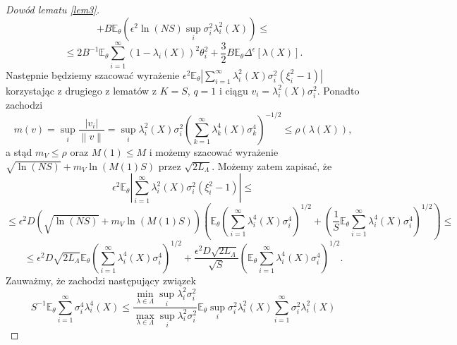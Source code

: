 \documentclass{mwart}
\newcommand{\norm}[1]{\left\lVert#1\right\rVert}
\begin{document}
\begin{proof}[Dowód lematu \ref{lem3}]
\begin{displaymath}
\end{displaymath}
\begin{displaymath}
+B\mathbb{E}_{\theta}\left(\epsilon^2\ln (NS)\sup_i\sigma_i^2\lambda_i^2(X)\right)\leq
\end{displaymath}
\begin{displaymath}
\leq 2B^{-1}\mathbb{E}_{\theta}\sum_{i=1}^{\infty}(1-\lambda_i(X))^2\theta_i^2+\frac{3}{2}B\mathbb{E}_{\theta}\Delta^{\epsilon}[\lambda(X)].
\end{displaymath}
Następnie będziemy szacować wyrażenie $\epsilon^2\mathbb{E}_{\theta}\left|\sum_{i=1}^{\infty}\lambda_i^2(X)\sigma_i^2(\xi^2_i-1)\right|$ korzystając z drugiego z lematów z $K=S$, $q=1$ i ciągu $v_i=\lambda_i^2(X)\sigma_i^2$. Ponadto zachodzi 
\begin{displaymath}
m(v)=\sup_i\frac{|v_i|}{\norm{v}}=\sup_i\lambda_i^2(X)\sigma_i^2\left(\sum_{k=1}^{\infty}\lambda_k^4(X)\sigma_k^4\right)^{-1/2}\leq \rho (\lambda(X)),
\end{displaymath}
a stąd $m_V\leq \rho$ oraz $M(1)\leq M$ i możemy szacować wyrażenie $\sqrt{\ln (NS)}+m_V\ln (M(1)S)$ przez $\sqrt{2L_{\Lambda}}$. Możemy zatem zapisać, że
\begin{displaymath}
\epsilon^2\mathbb{E}_{\theta}\left|\sum_{i=1}^{\infty}\lambda_i^2(X)\sigma_i^2(\xi^2_i-1)\right|\leq
\end{displaymath}
\begin{displaymath}
\leq \epsilon^2D\left(\sqrt{\ln (NS)}+m_V\ln (M(1)S)\right)\left(\mathbb{E}_{\theta}\left(\sum_{i=1}^{\infty}\lambda_i^4(X)\sigma_i^4\right)^{1/2}+\left(\frac{1}{S}\mathbb{E}_{\theta}\sum_{i=1}^{\infty}\lambda_i^4(X)\sigma_i^4\right)^{1/2}\right)\leq
\end{displaymath}
\begin{displaymath}
\leq \epsilon^2D\sqrt{2L_{\Lambda}}\mathbb{E}_{\theta}\left(\sum_{i=1}^{\infty}\lambda_i^4(X)\sigma_i^4\right)^{1/2}+\frac{\epsilon^2D\sqrt{2L_{\Lambda}}}{\sqrt{S}}\left(\mathbb{E}_{\theta}\sum_{i=1}^{\infty}\lambda_i^4(X)\sigma_i^4\right)^{1/2}.
\end{displaymath}
Zauważmy, że zachodzi następujący związek
\begin{displaymath}
S^{-1}\mathbb{E}_{\theta}\sum_{i=1}^{\infty}\sigma_i^4\lambda_i^4(X)\leq \frac{\min_{\lambda\in \Lambda}\sup_i \lambda_i^2\sigma_i^2}{\max_{\lambda\in \Lambda}\sup_i \lambda_i^2\sigma_i^2}\mathbb{E}_{\theta}\sup_i\sigma_i^2\lambda_i^2(X)\sum_{i=1}^{\infty}\sigma_i^2\lambda_i^2(X)
\end{displaymath}
\begin{displaymath}

\end{displaymath}
\end{proof}
\end{document}
